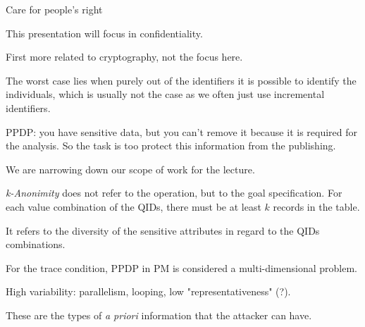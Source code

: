 
\nextslides[slide=2] 

Care for people's right

\nextslides

This presentation will focus in confidentiality.

\nextslides

First more related to cryptography, not the focus here.

\nextslides[slide=6] 

The worst case lies when purely out of the identifiers it is possible to identify the individuals, which is usually not the case as we often just use incremental identifiers.

\nextslides[slide=9] 

PPDP: you have sensitive data, but you can't remove it because it is required for the analysis. So the task is too protect this information from the publishing.

\nextslides

We are narrowing down our scope of work for the lecture.

\nextslides

\nextslides[slide=13] 

\nextslides

\nextslides

\nextslides

\emph{k-Anonimity} does not refer to the operation, but to the goal specification. For each value combination of the QIDs, there must be at least $k$ records in the table.

\nextslides

It refers to the diversity of the sensitive attributes in regard to the QIDs combinations.

\nextslides

\nextslides

For the trace condition, PPDP in PM is considered a multi-dimensional problem.

\nextslides

\nextslides

High variability: parallelism, looping, low "representativeness" (?).

\nextslides[until=26] 

These are the types of \emph{a priori} information that the attacker can have.

\nextslides[slide=27] 

